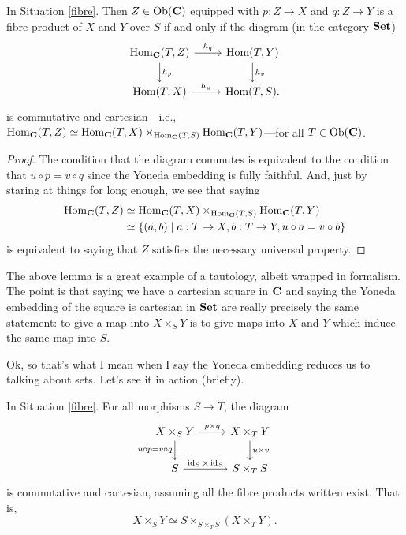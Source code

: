 \begin{lemma}
  \label{magic}
  In Situation \ref{fibre}. Then $Z \in \operatorname{Ob}(\mathbf{C})$ equipped with $p : Z
  \to X$ and $q : Z \to Y$ is a fibre product of $X$ and $Y$ over $S$
  if and only if the diagram (in the category $\mathbf{Set}$)
  \[
  \begin{tikzcd}
    \Hom_\C(T, Z) \rar{h_q} \dar{h_p} & \Hom(T, Y) \dar{h_v}
    \\ \Hom(T,X) \rar{h_u} & \Hom(T,S).
  \end{tikzcd}
  \]
  is commutative and cartesian---i.e., $\operatorname{Hom}_{\mathbf{C}}(T,Z) \simeq
  \operatorname{Hom}_{\mathbf{C}}(T,X) \times_{\operatorname{Hom}_{\mathbf{C}}(T,S)} \operatorname{Hom}_{\mathbf{C}}(T,Y)$---for all $T \in
  \operatorname{Ob}(\mathbf{C})$.
\end{lemma}

\begin{proof}
  The condition that the diagram commutes is equivalent to the
  condition that $u \circ p = v \circ q$ since the Yoneda embedding is
  fully faithful. And, just by staring at things for long enough, we
  see that saying
  \begin{align*}
  \operatorname{Hom}_{\mathbf{C}}(T,Z) &\simeq \operatorname{Hom}_{\mathbf{C}}(T,X) \times_{\operatorname{Hom}_{\mathbf{C}}(T,S)} \operatorname{Hom}_{\mathbf{C}}(T,Y)
  \\ &\simeq \{(a, b) \mid a : T \to X, b : T \to Y, u \circ a = v
  \circ b\}
  \end{align*}
  is equivalent to saying that $Z$ satisfies the necessary universal
  property.
\end{proof}

\begin{remark}
  The above lemma is a great example of a tautology, albeit wrapped in
  formalism. The point is that saying we have a cartesian square in
  $\mathbf{C}$ and saying the Yoneda embedding of the square is cartesian in
  $\mathbf{Set}$ are really precisely the same statement: to give a map into
  $X \times_S Y$ is to give maps into $X$ and $Y$ which induce the
  same map into $S$.
\end{remark}

Ok, so that's what I mean when I say the Yoneda embedding reduces us
to talking about sets. Let's see it in action (briefly).

\begin{lemma}
  In Situation \ref{fibre}. For all morphisms $S \to T$, the diagram
  \[
  \begin{tikzcd}
    X \times_S Y \rar{p \times q} \ar{d}[left]{u \circ p = v \circ q}
    & X \times_T Y \dar{u \times v} \\ S \rar{\id_S \times \id_S} & S
    \times_T S
  \end{tikzcd}
  \]
  is commutative and cartesian, assuming all the fibre products
  written exist. That is,
  \[
  X \times_S Y \simeq S \times_{S \times_T S} (X \times_T Y).
  \]
\end{lemma}


